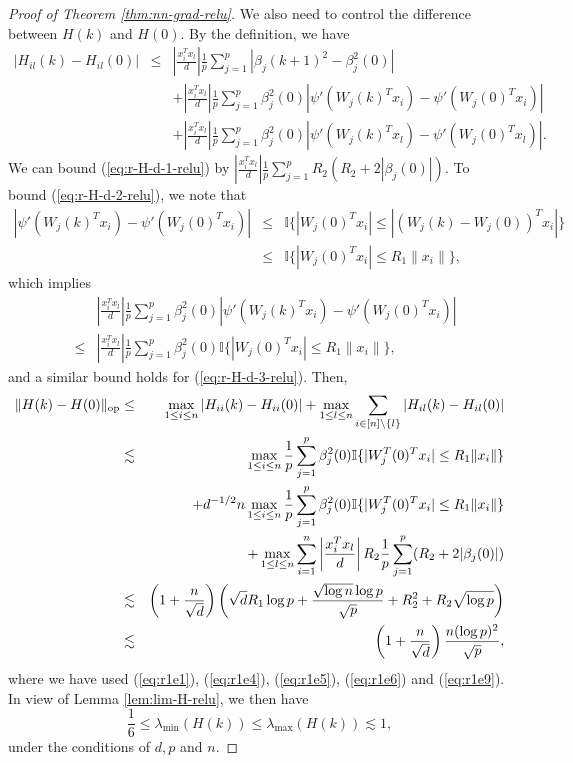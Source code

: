 \begin{proof}[Proof of Theorem \ref{thm:nn-grad-relu}]
We also need to control the difference between $H(k)$ and $H(0)$. By the definition, we have
\begin{eqnarray}
\label{eq:r-H-d-1-relu} |H_{il}(k)-H_{il}(0)| &\leq& \left|\frac{x_i^Tx_l}{d}\right|\frac{1}{p}\sum_{j=1}^p|\beta_j(k+1)^2-\beta_j^2(0)| \\
\label{eq:r-H-d-2-relu} && + \left|\frac{x_i^Tx_l}{d}\right|\frac{1}{p}\sum_{j=1}^p\beta_j^2(0)|\psi'(W_j(k)^Tx_i) - \psi'(W_j(0)^Tx_i)| \\
\label{eq:r-H-d-3-relu} && + \left|\frac{x_i^Tx_l}{d}\right|\frac{1}{p}\sum_{j=1}^p\beta_j^2(0)|\psi'(W_j(k)^Tx_l) - \psi'(W_j(0)^Tx_l)|.
\end{eqnarray}
We can bound (\ref{eq:r-H-d-1-relu}) by $\left|\frac{x_i^Tx_l}{d}\right|\frac{1}{p}\sum_{j=1}^pR_2(R_2+2|\beta_j(0)|)$. To bound (\ref{eq:r-H-d-2-relu}), we note that
\begin{eqnarray}
\nonumber |\psi'(W_j(k)^Tx_i) - \psi'(W_j(0)^Tx_i)| &\leq& \mathbb{I}\{|W_j(0)^Tx_i|\leq |(W_j(k)-W_j(0))^Tx_i|\} \\
\label{eq:simon-bound} &\leq& \mathbb{I}\{|W_j(0)^Tx_i|\leq R_1\|x_i\|\},
\end{eqnarray}
which implies
\begin{eqnarray*}
&& \left|\frac{x_i^Tx_l}{d}\right|\frac{1}{p}\sum_{j=1}^p\beta_j^2(0)|\psi'(W_j(k)^Tx_i) - \psi'(W_j(0)^Tx_i)| \\
&\leq& \left|\frac{x_i^Tx_l}{d}\right|\frac{1}{p}\sum_{j=1}^p\beta_j^2(0)\mathbb{I}\{|W_j(0)^Tx_i|\leq R_1\|x_i\|\},
\end{eqnarray*}
and a similar bound holds for (\ref{eq:r-H-d-3-relu}). Then,
\begin{eqnarray*}
\opnorm{H(k)-H(0)} &\leq& \max_{1\leq i\leq n}|H_{ii}(k)-H_{ii}(0)| + \max_{1\leq l\leq n}\sum_{i\in[n]\backslash\{l\}}|H_{il}(k)-H_{il}(0)| \\
&\lesssim& \max_{1\leq i\leq n} \frac{1}{p}\sum_{j=1}^p\beta_j^2(0)\mathbb{I}\{|W_j^T(0)^Tx_i|\leq R_1\|x_i\|\} \\
&& + d^{-1/2}n\max_{1\leq i\leq n}\frac{1}{p}\sum_{j=1}^p\beta_j^2(0)\mathbb{I}\{|W_j^T(0)^Tx_i|\leq R_1\|x_i\|\} \\
&& + \max_{1\leq l\leq n}\sum_{i=1}^n\left|\frac{x_i^Tx_l}{d}\right|R_2\frac{1}{p}\sum_{j=1}^p(R_2+2|\beta_j(0)|) \\
&\lesssim& \left(1+\frac{n}{\sqrt{d}}\right)\left(\sqrt{d}R_1\log p+\frac{\sqrt{\log n}\log p}{\sqrt{p}} + R_2^2 + R_2\sqrt{\log p}\right) \\
&\lesssim& \left(1+\frac{n}{\sqrt{d}}\right)\frac{n(\log p)^2}{\sqrt{p}},
\end{eqnarray*}
where we have used (\ref{eq:r1e1}), (\ref{eq:r1e4}), (\ref{eq:r1e5}), (\ref{eq:r1e6}) and (\ref{eq:r1e9}). In view of Lemma \ref{lem:lim-H-relu}, we then have
\begin{equation}
\frac{1}{6} \leq \lambda_{\min}(H(k)) \leq \lambda_{\max}(H(k)) \lesssim 1, \label{eq:Hk-spec}
\end{equation}
under the conditions of $d,p$ and $n$.


\end{proof}
